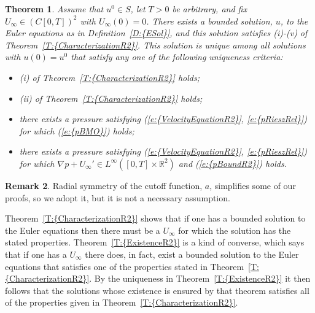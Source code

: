 \documentclass[reqno,openright,11pt,twoside]{amsart}
\newtheorem{theorem}{Theorem}[section]
\theoremstyle{definition}
\newtheorem{remark}[theorem]{Remark}
\numberwithin{equation}{section}
\begin{document}
\begin{theorem}\label{T:ExistenceR2}
    Assume that $u^0 \in S$, let $T > 0$ be arbitrary, and fix
    $U_{\ensuremath{\infty}} \in (C[0, T])^2$ with $U_{\ensuremath{\infty}}(0) = 0$. There exists a
    bounded solution, $u$, to the Euler equations as in {Definition~\ref{D:{ESol}}},
    and this solution satisfies (i)-(v) of
    {Theorem~\ref{T:{CharacterizationR2}}}.
    This solution is unique among all solutions
    with $u(0) = u^0$ that satisfy any one of the following
    uniqueness criteria:
    \begin{itemize}
        \item[(a)]    
            (i) of {Theorem~\ref{T:{CharacterizationR2}}} holds;

        \item[(b)]
            (ii) of {Theorem~\ref{T:{CharacterizationR2}}} holds;

        \item[(c)]
            there exists a pressure satisfying
            {(\ref{e:{VelocityEquationR2}}, \ref{e:{pRieszRel}})} for which
            {(\ref{e:{pBMO}})} holds;
            
        \item[(d)]
            there exists a pressure satisfying
            {(\ref{e:{VelocityEquationR2}}, \ref{e:{pRieszRel}})} for which 
            ${\ensuremath{\nabla}} p + U_{\ensuremath{\infty}}' \in L^{\ensuremath{\infty}}([0, T] \times {\ensuremath{{\ensuremath{\mathbb{{R}}}}}}^2)$
            and {(\ref{e:{pBoundR2}})} holds.
    \end{itemize}
\end{theorem}

\begin{remark}
	Radial symmetry of the cutoff function, $a$, simplifies some of our proofs,
	so we adopt it, but it is not a necessary assumption.
\end{remark}

{Theorem~\ref{T:{CharacterizationR2}}} shows that if one has a bounded solution to the Euler equations then there must be a $U_{\ensuremath{\infty}}$ for which the solution has the stated properties. {Theorem~\ref{T:{ExistenceR2}}} is a kind of converse, which says that if one has a $U_{\ensuremath{\infty}}$ there does, in fact, exist a bounded solution to the Euler equations that satisfies one of the properties stated in {Theorem~\ref{T:{CharacterizationR2}}}. By the uniqueness in {Theorem~\ref{T:{ExistenceR2}}} it then follows that the solutions whose existence is ensured by that theorem satisfies all of the properties given in {Theorem~\ref{T:{CharacterizationR2}}}.
\end{document}
